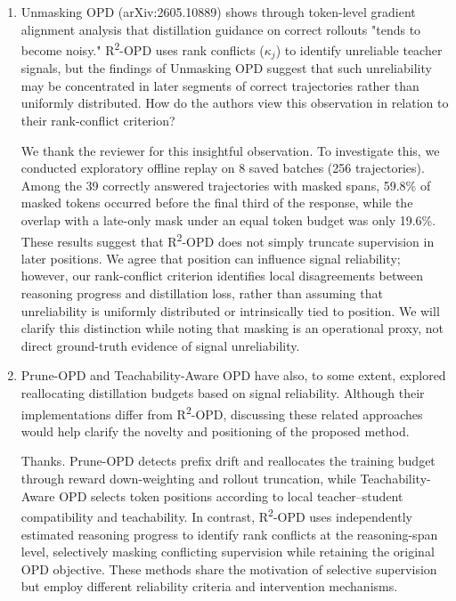 \documentclass[11pt,a4paper]{article}
\begin{document}
\begin{enumerate}
\item Unmasking OPD (arXiv:2605.10889) shows through token-level gradient alignment analysis that distillation guidance on correct rollouts "tends to become noisy." R\textsuperscript{2}-OPD uses rank conflicts ($\kappa_j$) to identify unreliable teacher signals, but the findings of Unmasking OPD suggest that such unreliability may be concentrated in later segments of correct trajectories rather than uniformly distributed. How do the authors view this observation in relation to their rank-conflict criterion?
\par{}
\begin{responsebox}[frametitle={Response to W4}]
We thank the reviewer for this insightful observation. To investigate this, we conducted exploratory offline replay on 8 saved batches (256 trajectories). Among the 39 correctly answered trajectories with masked spans, 59.8\% of masked tokens occurred before the final third of the response, while the overlap with a late-only mask under an equal token budget was only 19.6\%. These results suggest that R\textsuperscript{2}-OPD does not simply truncate supervision in later positions. We agree that position can influence signal reliability; however, our rank-conflict criterion identifies local disagreements between reasoning progress and distillation loss, rather than assuming that unreliability is uniformly distributed or intrinsically tied to position. We will clarify this distinction while noting that masking is an operational proxy, not direct ground-truth evidence of signal unreliability.
\end{responsebox}

\item Prune-OPD and Teachability-Aware OPD have also, to some extent, explored reallocating distillation budgets based on signal reliability. Although their implementations differ from R\textsuperscript{2}-OPD, discussing these related approaches would help clarify the novelty and positioning of the proposed method.
\par{}
\begin{responsebox}[frametitle={Response to W5}]
Thanks. Prune-OPD detects prefix drift and reallocates the training budget through reward down-weighting and rollout truncation, while Teachability-Aware OPD selects token positions according to local teacher--student compatibility and teachability. In contrast, R\textsuperscript{2}-OPD uses independently estimated reasoning progress to identify rank conflicts at the reasoning-span level, selectively masking conflicting supervision while retaining the original OPD objective. These methods share the motivation of selective supervision but employ different reliability criteria and intervention mechanisms.


\end{responsebox}
\end{enumerate}
\end{document}
